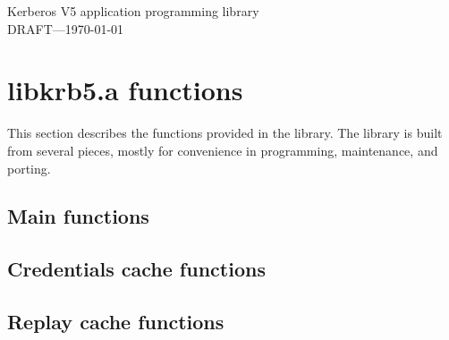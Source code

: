 \setlength{\oddsidemargin}{0in}
\setlength{\evensidemargin}{1.00in}
\setlength{\marginparsep}{0.05in}
\setlength{\marginparwidth}{1.25in}
\setlength{\textwidth}{5.5in}
\setlength{\topmargin}{-.5in}
\setlength{\textheight}{9in}
\setlength{\parskip}{.1in}
\setlength{\parindent}{2em}
\setlength{\footrulewidth}{0.4pt}
\setlength{\plainfootrulewidth}{0.4pt}
\setlength{\plainheadrulewidth}{0.4pt}
\makeindex
\newif\ifdraft
\drafttrue
%
%
\ifdraft
\pagestyle{fancyplain}
\addtolength{\headwidth}{\marginparsep}
\addtolength{\headwidth}{\marginparwidth}
\makeatletter
\renewcommand{\sectionmark}[1]{\markboth {\uppercase{\ifnum \c@secnumdepth >\z@
    \thesection\hskip 1em\relax \fi #1}}{}}%
\renewcommand{\subsectionmark}[1]{\markright {\ifnum \c@secnumdepth >\@ne
          \thesubsection\hskip 1em\relax \fi #1}}
\makeatother
\lhead[\thepage]{\fancyplain{}{\sl\rightmark}}
\rhead[\fancyplain{}{\sl\rightmark}]{\thepage}
\cfoot{\thepage}
\else\pagestyle{headings}\fi

\thispagestyle{empty}
\begin{center}
{\Huge Kerberos V5 application programming library}
\ifdraft \\ {\Large DRAFT---\today}\fi
\end{center}
\section{libkrb5.a functions}
This section describes the functions provided in the 
library.  The library is built from several pieces, mostly for convenience in
programming, maintenance, and porting.

\ifdraft\sloppy\fi

\subsection{Main functions}


\subsection{Credentials cache functions}


\subsection{Replay cache functions}


